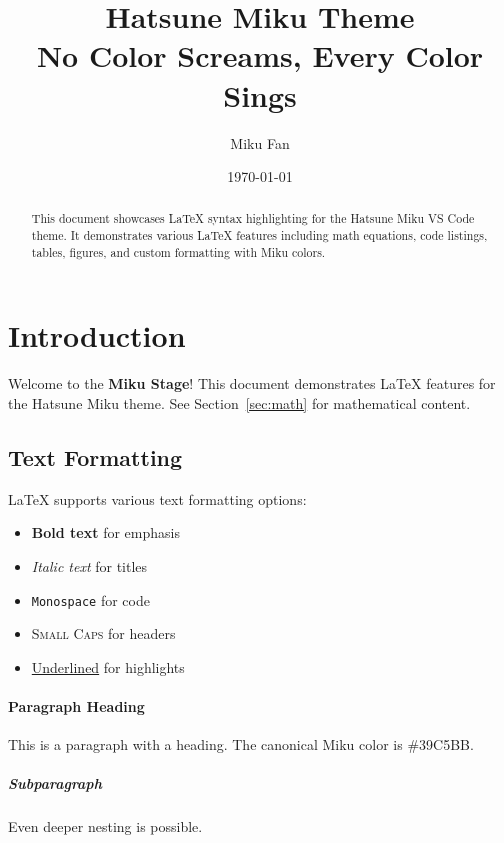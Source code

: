 \documentclass[12pt, a4paper]{article}
\title{\textcolor{mikuteal}{Hatsune Miku Theme} \\
       \large No Color Screams, Every Color Sings}
\author{Miku Fan}
\date{\today}
\newcommand{\miku}{\textcolor{mikuteal}{Miku}}
\newcommand{\highlight}[1]{\textcolor{mikupink}{\textbf{#1}}}
\begin{document}
\maketitle

\begin{abstract}
This document showcases \LaTeX{} syntax highlighting for the Hatsune Miku VS Code theme.
It demonstrates various \LaTeX{} features including math equations, code listings,
tables, figures, and custom formatting with \miku{} colors.
\end{abstract}

\tableofcontents
\newpage


\section{Introduction}
\label{sec:intro}

Welcome to the \highlight{Miku Stage}! This document demonstrates \LaTeX{} features
for the Hatsune Miku theme. See Section~\ref{sec:math} for mathematical content.

\subsection{Text Formatting}

\LaTeX{} supports various text formatting options:
\begin{itemize}
    \item \textbf{Bold text} for emphasis
    \item \textit{Italic text} for titles
    \item \texttt{Monospace} for code
    \item \textsc{Small Caps} for headers
    \item \underline{Underlined} for highlights
\end{itemize}

\paragraph{Paragraph Heading}
This is a paragraph with a heading. The canonical Miku color is \textcolor{mikuteal}{\#39C5BB}.

\subparagraph{Subparagraph}
Even deeper nesting is possible.
\end{document}
